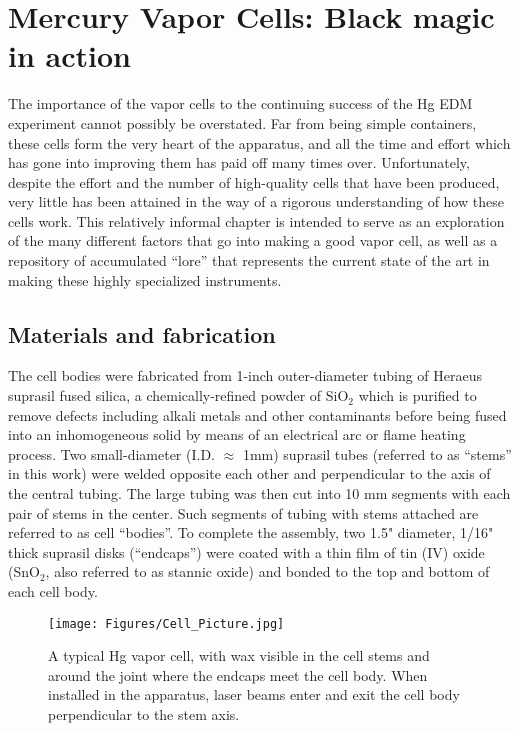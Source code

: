 \documentclass [10pt, twoside] {uwthesis}[2012/04/02]
\begin{document}
\chapter{Mercury Vapor Cells: Black magic in action}
\label{CellChap}
The importance of the vapor cells to the continuing success of the Hg EDM experiment cannot possibly be overstated. Far from being simple containers, these cells form the very heart of the apparatus, and all the time and effort which has gone into improving them has paid off many times over. Unfortunately, despite the effort and the number of high-quality cells that have been produced, very little has been attained in the way of a rigorous understanding of how these cells work. This relatively informal chapter is intended to serve as an exploration of the many different factors that go into making a good vapor cell, as well as a repository of accumulated ``lore'' that represents the current state of the art in making these highly specialized instruments. 

\section{Materials and fabrication}
The cell bodies were fabricated from 1-inch outer-diameter tubing of Heraeus suprasil fused silica, a chemically-refined powder of SiO$_2$ which is purified to remove defects including alkali metals and other contaminants before being fused into an inhomogeneous solid by means of an electrical arc or flame heating process. Two small-diameter (I.D. $\approx$ 1mm) suprasil tubes (referred to as ``stems'' in this work) were welded opposite each other and perpendicular to the axis of the central tubing. The large tubing was then cut into 10 mm segments with each pair of stems in the center. Such segments of tubing with stems attached are referred to as cell ``bodies''. To complete the assembly, two 1.5" diameter, 1/16" thick suprasil disks (``endcaps'') were coated with a thin film of tin (IV) oxide (SnO$_2$, also referred to as stannic oxide) and bonded to the top and bottom of each cell body. 

\begin{figure}
\begin{center}
\texttt{[image: Figures/Cell\_Picture.jpg]}
\end{center}
\caption[A typical Hg vapor cell]%
{\narrower A typical Hg vapor cell, with wax visible in the cell stems and around the joint where the endcaps meet the cell body. When installed in the apparatus, laser beams enter and exit the cell body perpendicular to the stem axis.}
\label{HgCell}
\end{figure} 
\end{document}
